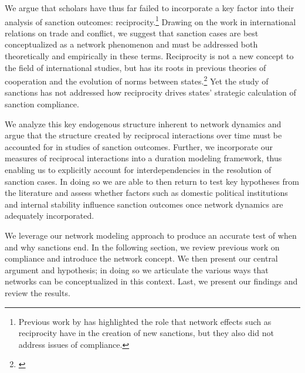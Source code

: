 We argue that scholars have thus far failed to incorporate a key factor into their analysis of sanction outcomes: reciprocity.\footnote{Previous work by \cite{cranmer2014reciprocity} has highlighted the role that network effects such as reciprocity have in the creation of new sanctions, but they also did not address issues of compliance.} Drawing on the work in international relations on trade and conflict, we suggest that sanction cases are best conceptualized as a network phenomenon and must be addressed both theoretically and empirically in these terms. Reciprocity is not a new concept to the field of international studies, but has its roots in previous theories of cooperation and the evolution of norms between states.\footnote{\cite{richardsonai:1960,choucri:north:1972,goldstein1991reciprocity,rajmaira1990evolving,ward1992reciprocity}} Yet the study of sanctions has not addressed how reciprocity drives  states' strategic calculation of sanction compliance. 

We analyze this key endogenous structure inherent to network dynamics and argue that the structure created by reciprocal interactions over time must be accounted for in studies of sanction outcomes. Further, we incorporate our measures of reciprocal interactions into a duration modeling framework, thus enabling us to explicitly account for interdependencies in the resolution of sanction cases. In doing so we are able to then return to test key hypotheses from the literature and assess whether factors such as domestic political institutions and internal stability influence sanction outcomes once network dynamics are adequately incorporated.  

We leverage our network modeling approach to produce an accurate test of when and why sanctions end. In the following section, we review previous work on compliance and introduce the network concept. We then present our central argument and hypothesis; in doing so we articulate the various ways that networks can be conceptualized in this context. Last, we present our findings and review the results.